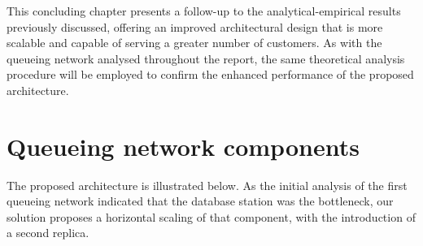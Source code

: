 This concluding chapter presents a follow-up to the analytical-empirical results previously discussed, offering an improved architectural design that is more scalable and capable of serving a greater number of customers.
As with the queueing network analysed throughout the report, the same theoretical analysis procedure will be employed to confirm the enhanced performance of the proposed architecture.

\section{Queueing network components}

The proposed architecture is illustrated below.
As the initial analysis of the first queueing network indicated that the database station was the bottleneck, our solution proposes a horizontal scaling of that component, with the introduction of a second replica.

